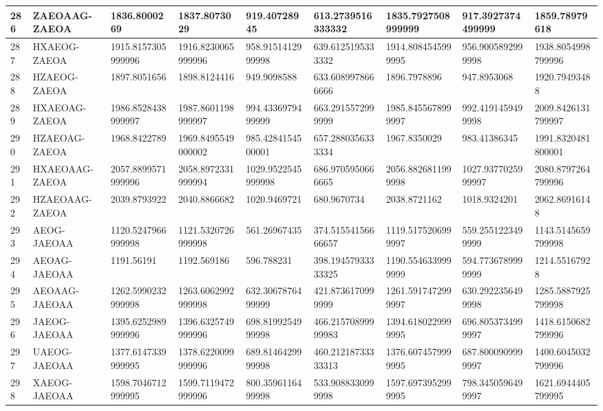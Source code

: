 {\begin{longtable}{|l|l|l|l|l|l|l|l|l|}
        286 & ZAEOAAG-ZAEOA & 1836.8000269 & 1837.8073029 & 919.40728945 & 613.2739516333332 & 1835.7927508999999 & 917.3927374499999 & 1859.78979618 \\ \hline
        287 & HXAEOG-ZAEOA & 1915.8157305999996 & 1916.8230065999996 & 958.9151412999998 & 639.6125195333332 & 1914.8084545999995 & 956.9005892999998 & 1938.8054998799996 \\ \hline
        288 & HZAEOG-ZAEOA & 1897.8051656 & 1898.8124416 & 949.9098588 & 633.6089978666666 & 1896.7978896 & 947.8953068 & 1920.79493488 \\ \hline
        289 & HXAEOAG-ZAEOA & 1986.8528438999997 & 1987.8601198999997 & 994.4336979499999 & 663.2915572999999 & 1985.8455678999997 & 992.4191459499998 & 2009.8426131799997 \\ \hline
        290 & HZAEOAG-ZAEOA & 1968.8422789 & 1969.8495549000002 & 985.4284154500001 & 657.2880356333334 & 1967.8350029 & 983.41386345 & 1991.8320481800001 \\ \hline
        291 & HXAEOAAG-ZAEOA & 2057.8899571999996 & 2058.8972331999994 & 1029.9522545999998 & 686.9705950666665 & 2056.8826811999998 & 1027.9377025999997 & 2080.8797264799996 \\ \hline
        292 & HZAEOAAG-ZAEOA & 2039.8793922 & 2040.8866682 & 1020.9469721 & 680.9670734 & 2038.8721162 & 1018.9324201 & 2062.86916148 \\ \hline
        293 & AEOG-JAEOAA & 1120.5247966999998 & 1121.5320726999998 & 561.26967435 & 374.51554156666657 & 1119.5175206999997 & 559.2551223499999 & 1143.5145659799998 \\ \hline
        294 & AEOAG-JAEOAA & 1191.56191 & 1192.569186 & 596.788231 & 398.19457933333325 & 1190.5546339999999 & 594.7736789999999 & 1214.55167928 \\ \hline
        295 & AEOAAG-JAEOAA & 1262.5990232999998 & 1263.6062992999998 & 632.3067876499999 & 421.8736170999999 & 1261.5917472999997 & 630.2922356499998 & 1285.5887925799998 \\ \hline
        296 & JAEOG-JAEOAA & 1395.6252989999996 & 1396.6325749999996 & 698.8199254999998 & 466.21570899999983 & 1394.6180229999995 & 696.8053734999997 & 1418.6150682799996 \\ \hline
        297 & UAEOG-JAEOAA & 1377.6147339999995 & 1378.6220099999996 & 689.8146429999998 & 460.21218733333313 & 1376.6074579999995 & 687.8000909999997 & 1400.6045032799996 \\ \hline
        298 & XAEOG-JAEOAA & 1598.7046712999995 & 1599.7119472999996 & 800.3596116499998 & 533.9088330999998 & 1597.6973952999995 & 798.3450596499997 & 1621.6944405799995 \\ \hline

\end{longtable}}
